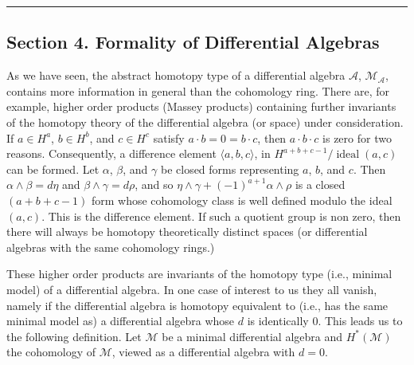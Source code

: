 \documentclass[
  english,
  a3paper,
  a3paper]{extarticle}
\begin{document}
\clearpage



\par

\vspace{0.7mm}\hrule\vspace{1.6mm}

\fontsize{9}{11}\selectfont

\subsection{Section 4. Formality of Differential
Algebras}\label{section-4.-formality-of-differential-algebras}

As we have seen, the abstract homotopy type of a differential algebra
\(\mathcal A\), \(\mathcal M_{\mathcal A}\), contains more information
in general than the cohomology ring. There are, for example, higher
order products (Massey products) containing further invariants of the
homotopy theory of the differential algebra (or space) under
consideration. If \(a\in H^a\), \(b\in H^b\), and \(c\in H^c\) satisfy
\(a\cdot b=0=b\cdot c\), then \(a\cdot b\cdot c\) is zero for two
reasons. Consequently, a difference element \(\langle a,b,c\rangle\), in
\(H^{a+b+c-1}/\operatorname{ideal}(a,c)\) can be formed. Let \(\alpha\),
\(\beta\), and \(\gamma\) be closed forms representing \(a\), \(b\), and
\(c\). Then \(\alpha\wedge\beta=d\eta\) and \(\beta\wedge\gamma=d\rho\),
and so \(\eta\wedge\gamma+(-1)^{a+1}\alpha\wedge\rho\) is a closed
\((a+b+c-1)\) form whose cohomology class is well defined modulo the
ideal \((a,c)\). This is the difference element. If such a quotient
group is non zero, then there will always be homotopy theoretically
distinct spaces (or differential algebras with the same cohomology
rings.)

These higher order products are invariants of the homotopy type (i.e.,
minimal model) of a differential algebra. In one case of interest to us
they all vanish, namely if the differential algebra is homotopy
equivalent to (i.e., has the same minimal model as) a differential
algebra whose \(d\) is identically 0. This leads us to the following
definition. Let \(\mathcal M\) be a minimal differential algebra and
\(H^*(\mathcal M)\) the cohomology of \(\mathcal M\), viewed as a
differential algebra with \(d=0\).
\end{document}
